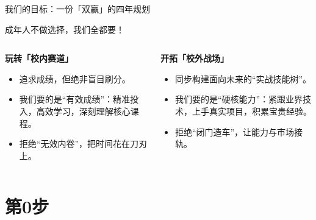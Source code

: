 \documentclass{beamer}
\begin{document}
\begin{frame}{我们的目标：一份「双赢」的四年规划}
    \begin{center}
        \Large
        成年人不做选择，\alert{我们全都要！}
    \end{center}


    \begin{columns}[T]
        \begin{column}{0.5\textwidth}
            \Large\textbf{玩转「校内赛道」}
            \vspace{0.2cm}
            \begin{itemize}
                \item 追求成绩，但绝非盲目刷分。
                \item 我们要的是\alert{“有效成绩”}：精准投入，高效学习，深刻理解核心课程。
                \item 拒绝“无效内卷”，把时间花在刀刃上。
            \end{itemize}
        \end{column}
        
        \begin{column}{0.5\textwidth}
            \Large\textbf{开拓「校外战场」}
            \vspace{0.2cm}
            \begin{itemize}
                \item 同步构建面向未来的“实战技能树”。
                \item 我们要的是\alert{“硬核能力”}：紧跟业界技术，上手真实项目，积累宝贵经验。
                \item 拒绝“闭门造车”，让能力与市场接轨。
            \end{itemize}
        \end{column}
    \end{columns}

\end{frame}


\section{第0步}
\end{document}

